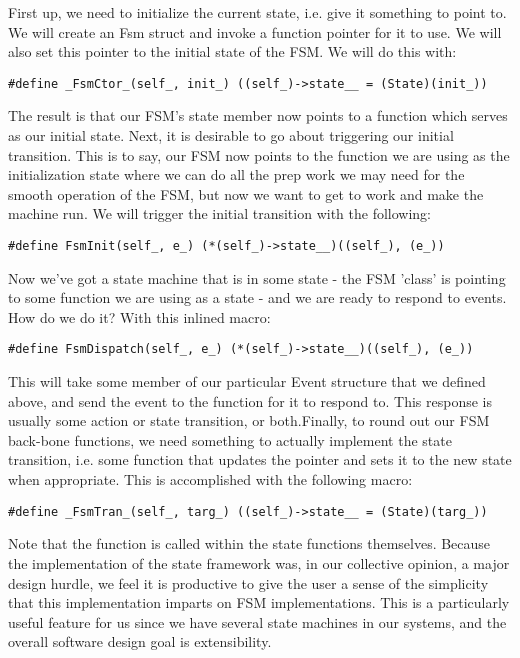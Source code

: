 First up, we need to initialize the current state, i.e. give it something to point to. We will create an Fsm struct and invoke a function pointer for it to use. We will also set this pointer to the initial state of the FSM. We will do this with:

\begin{lstlisting}
#define _FsmCtor_(self_, init_) ((self_)->state__ = (State)(init_))
\end{lstlisting}
The result is that our FSM's state member now points to a function which serves as our initial state. Next, it is desirable to go about triggering our initial transition. This is to say, our FSM now points to the function we are using as the initialization state where we can do all the prep work we may need for the smooth operation of the FSM, but now we want to get to work and make the machine run. We will trigger the initial transition with the following:

\begin{lstlisting}
#define FsmInit(self_, e_) (*(self_)->state__)((self_), (e_))
\end{lstlisting}

Now we've got a state machine that is in some state - the FSM 'class' is pointing to some function we are using as a state - and we are ready to respond to events. How do we do it? With this inlined macro:

\begin{lstlisting}
#define FsmDispatch(self_, e_) (*(self_)->state__)((self_), (e_))
\end{lstlisting}


This will take some member of our particular Event structure that we defined above, and send the event to the function for it to respond to. This response is usually some action or state transition, or both.Finally, to round out our FSM back-bone functions, we need something to actually implement the state transition, i.e. some function that updates the pointer and sets it to the new state when appropriate. This is accomplished with the following macro:
\begin{lstlisting}
#define _FsmTran_(self_, targ_) ((self_)->state__ = (State)(targ_))
\end{lstlisting}
Note that the function is called within the state functions themselves. Because the implementation of the state framework was, in our collective opinion, a major design hurdle, we feel it is productive to give the user a sense of the simplicity that this implementation imparts on FSM implementations. This is a particularly useful feature for us since we have several state machines in our systems, and the overall software design goal is extensibility.  

